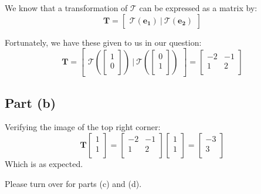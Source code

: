 \documentclass{article}
\begin{document}
We know that a transformation of $ \mathcal{T}  $ can be expressed as a matrix
by:
\[%
    \mathbf{T}=
    \begin{bmatrix}
        \mathcal{T}(\mathbf{e_{1}})  \ | \ \mathcal{T} (\mathbf{e_{2}})
    \end{bmatrix}
\]%

Fortunately, we have these given to us in our question:
\[%
    \mathbf{T} =
    \begin{bmatrix}
        \mathcal{T}\left(\begin{bmatrix} 1 \\ 0 \\ \end{bmatrix}\right) \ \bigg| \ 
        \mathcal{T}\left(\begin{bmatrix} 0\\1\\ \end{bmatrix}\right)
    \end{bmatrix}
    =
    \begin{bmatrix}
        -2 & -1 \\
		1 &  2  \\		
    \end{bmatrix}
\]%

\subsection{Part (b)} 
Verifying the image of the top right corner:
\[%
    \mathbf{T}
    \begin{bmatrix}
        1\\1\\
    \end{bmatrix}
    =
    \begin{bmatrix}
        -2 & -1 \\
		1 &  2  \\		
    \end{bmatrix}
    \begin{bmatrix}
        1\\1\\
    \end{bmatrix}
    =
    \begin{bmatrix}
        -3\\3\\
    \end{bmatrix}   
\]%
Which is as expected.

Please turn over for parts (c) and (d).

\clearpage
\end{document}
